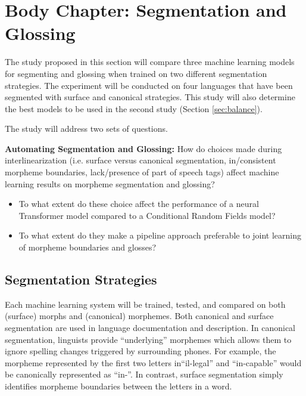 \section{Body Chapter: Segmentation and Glossing}
\label{sec:seggls}

The study proposed in this section will compare three machine learning models for segmenting and glossing when trained on two different segmentation strategies. The experiment will be conducted on four languages that have been segmented with surface and canonical strategies. 
This study will also determine the best models to be used in the second study (Section \ref{sec:balance}). 

The study will address two sets of questions.

\item{} \textbf{Automating Segmentation and Glossing:} How do choices made during interlinearization (i.e. surface versus canonical segmentation, in/consistent morpheme boundaries, lack/presence of part of speech tags) affect machine learning results on morpheme segmentation and glossing? 
     \begin{itemize}
        \item To what extent do these choice affect the performance of a neural Transformer model compared to a Conditional Random Fields model? 
        \item To what extent do they make a pipeline approach preferable to joint learning of morpheme boundaries and glosses?
    \end{itemize}
    
\subsection{Segmentation Strategies}    
Each machine learning system will be trained, tested, and compared on both (surface) morphs and (canonical) morphemes. Both canonical and surface segmentation are used in language documentation and description. In canonical segmentation, linguists provide ``underlying'' morphemes which allows them to ignore spelling changes triggered by surrounding phones. For example, the morpheme represented by the first two letters in``il-legal'' and ``in-capable'' would be canonically represented as ``in-''. In contrast, surface segmentation simply identifies morpheme boundaries between the letters in a word. 

